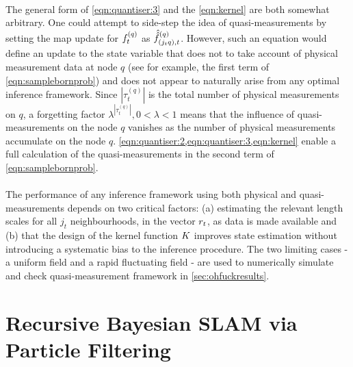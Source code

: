\\ The general form of \cref{eqn:quantiser:3} and the \cref{eqn:kernel} are both somewhat arbitrary. One could attempt to side-step the idea of quasi-measurements by setting the map update for $f^{( q )}_{t}$ as $\hat{\hat{f}}^{(q)}_{(j_tq),t}$. However, such an equation would define an update to the state variable that does not to take account of physical measurement data at node $q$ (see for example, the first term of \cref{eqn:samplebornprob}) and does not appear to naturally arise from any optimal inference framework. Since $|\tau^{(q)}_t|$ is the total number of physical measurements on $q$,  a forgetting factor $\lambda^{|\tau^{(q)}_t|}, 0 < \lambda < 1$ means that the influence of quasi-measurements on the node $q$ vanishes as the number of physical measurements accumulate on the node $q$. \cref{eqn:quantiser:2,eqn:quantiser:3,eqn:kernel} enable a full calculation of the quasi-measurements in the second term of \cref{eqn:samplebornprob}. \\ %
\\
The performance of any inference framework using both physical and quasi-measurements depends on two critical factors: (a) estimating the relevant length scales for all $j_t$ neighbourhoods, in the vector $r_{ t}$, as data is made available and (b) that the design of the kernel function $K$ improves state estimation without introducing a systematic bias to the inference procedure. The two limiting cases - a uniform field and a rapid fluctuating field - are used to numerically simulate and check quasi-measurement framework in \cref{sec:ohfuckresults}.  

\section{Recursive Bayesian SLAM via Particle Filtering}
 
